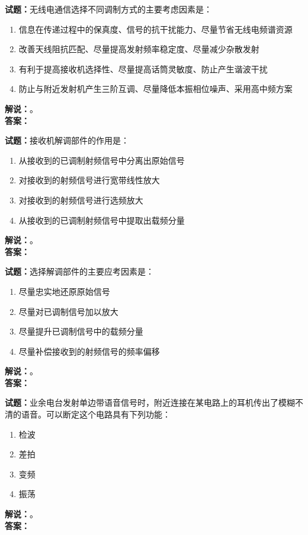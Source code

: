 \documentclass{ctexbook}
\begin{document}
\vspace{\baselineskip}

\noindent\textbf{试题：}无线电通信选择不同调制方式的主要考虑因素是：
\begin{enumerate}[leftmargin=3em]
  \item 信息在传递过程中的保真度、信号的抗干扰能力、尽量节省无线电频谱资源
  \item 改善天线阻抗匹配、尽量提高发射频率稳定度、尽量减少杂散发射
  \item 有利于提高接收机选择性、尽量提高话筒灵敏度、防止产生谐波干扰
  \item 防止与附近发射机产生三阶互调、尽量降低本振相位噪声、采用高中频方案
\end{enumerate}
\noindent\textbf{解说：}\textbf{}。\\\noindent\textbf{答案：}

\vspace{\baselineskip}

\noindent\textbf{试题：}接收机解调部件的作用是：
\begin{enumerate}[leftmargin=3em]
  \item 从接收到的已调制射频信号中分离出原始信号
  \item 对接收到的射频信号进行宽带线性放大
  \item 对接收到的射频信号进行选频放大
  \item 从接收到的已调制射频信号中提取出载频分量
\end{enumerate}
\noindent\textbf{解说：}\textbf{}。\\\noindent\textbf{答案：}

\vspace{\baselineskip}

\noindent\textbf{试题：}选择解调部件的主要应考因素是：
\begin{enumerate}[leftmargin=3em]
  \item 尽量忠实地还原原始信号
  \item 尽量对已调制信号加以放大
  \item 尽量提升已调制信号中的载频分量
  \item 尽量补偿接收到的射频信号的频率偏移
\end{enumerate}
\noindent\textbf{解说：}\textbf{}。\\\noindent\textbf{答案：}

\vspace{\baselineskip}

\noindent\textbf{试题：}业余电台发射单边带语音信号时，附近连接在某电路上的耳机传出了模糊不清的语音。可以断定这个电路具有下列功能：
\begin{enumerate}[leftmargin=3em]
  \item 检波
  \item 差拍
  \item 变频
  \item 振荡
\end{enumerate}
\noindent\textbf{解说：}\textbf{}。\\\noindent\textbf{答案：}
\end{document}
